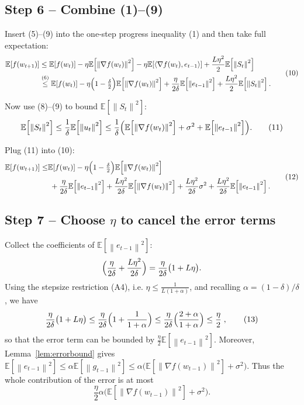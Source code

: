 \documentclass{article}
\newcommand{\E}{\mathbb{E}}
\newcommand{\norm}[1]{\left\lVert#1\right\rVert}
\begin{document}
\subsection*{Step 6 – Combine (1)–(9)}
Insert (5)–(9) into the one‑step progress inequality (1) and then take full
expectation:
\[
\begin{aligned}
\E\!\left[f(w_{t+1})\right]
&\le \E\!\left[f(w_t)\right]
-\eta\E\!\left[\norm{\nabla f(w_t)}^{2}\right]
-\eta\E\!\left[\langle\nabla f(w_t),e_{t-1}\rangle\right]
+\frac{L\eta^{2}}{2}\E\!\left[\norm{S_t}^{2}\right] \\
&\stackrel{(6)}{\le}
\E\!\left[f(w_t)\right]
-\eta\Bigl(1-\tfrac{\delta}{2}\Bigr)\E\!\left[\norm{\nabla f(w_t)}^{2}\right]
+\frac{\eta}{2\delta}\E\!\left[\norm{e_{t-1}}^{2}\right]
+\frac{L\eta^{2}}{2}\E\!\left[\norm{S_t}^{2}\right].
\end{aligned}
\tag{10}
\]

Now use (8)–(9) to bound $\E[\norm{S_t}^{2}]$:
\[
\E\!\left[\norm{S_t}^{2}\right]
\le \frac{1}{\delta}\E\!\left[\norm{u_t}^{2}\right]
\le \frac{1}{\delta}\Bigl(\E\!\left[\norm{\nabla f(w_t)}^{2}\right]
+\sigma^{2}+\E\!\left[\norm{e_{t-1}}^{2}\right]\Bigr). \tag{11}
\]

Plug (11) into (10):
\[
\begin{aligned}
\E\!\left[f(w_{t+1})\right]
\le &\E\!\left[f(w_t)\right]
-\eta\Bigl(1-\tfrac{\delta}{2}\Bigr)\E\!\left[\norm{\nabla f(w_t)}^{2}\right] \\
&\;+\frac{\eta}{2\delta}\E\!\left[\norm{e_{t-1}}^{2}\right]
+\frac{L\eta^{2}}{2\delta}\E\!\left[\norm{\nabla f(w_t)}^{2}\right]
+\frac{L\eta^{2}}{2\delta}\sigma^{2}
+\frac{L\eta^{2}}{2\delta}\E\!\left[\norm{e_{t-1}}^{2}\right].
\end{aligned}
\tag{12}
\]

\subsection*{Step 7 – Choose $\eta$ to cancel the error terms}
Collect the coefficients of $\E[\norm{e_{t-1}}^{2}]$:
\[
\Bigl(\frac{\eta}{2\delta}+\frac{L\eta^{2}}{2\delta}\Bigr)
= \frac{\eta}{2\delta}\bigl(1+L\eta\bigr).
\]
Using the stepsize restriction (A4), i.e. $\eta\le\frac{1}{L(1+\alpha)}$,
and recalling $\alpha=(1-\delta)/\delta$, we have
\[
\frac{\eta}{2\delta}\bigl(1+L\eta\bigr)\le
\frac{\eta}{2\delta}\Bigl(1+\frac{1}{1+\alpha}\Bigr)
\le \frac{\eta}{2\delta}\Bigl(\frac{2+\alpha}{1+\alpha}\Bigr)
\le \frac{\eta}{2}\;,
\tag{13}
\]
so that the error term can be bounded by $\frac{\eta}{2}\E[\norm{e_{t-1}}^{2}]$.
Moreover, Lemma~\ref{lem:errorbound} gives $\E[\norm{e_{t-1}}^{2}]
\le\alpha\E[\norm{g_{t-1}}^{2}]
\le\alpha\bigl(\E[\norm{\nabla f(w_{t-1})}^{2}]+\sigma^{2}\bigr)$.
Thus the whole contribution of the error is at most
\[
\frac{\eta}{2}\alpha\bigl(\E[\norm{\nabla f(w_{t-1})}^{2}]+\sigma^{2}\bigr).
\tag{14}
\]
\end{document}
